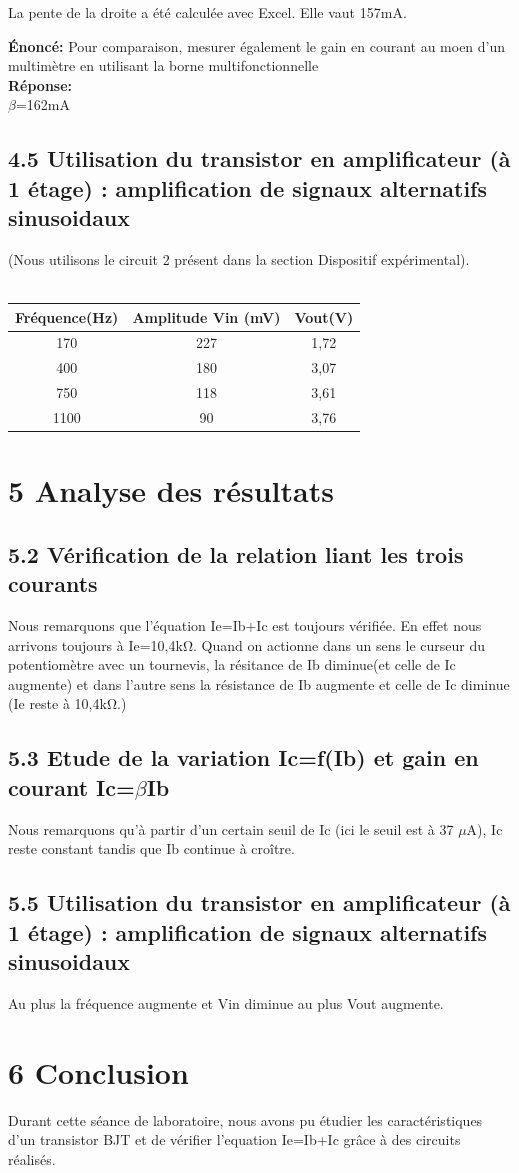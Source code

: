 \documentclass{report}
\begin{document}
La pente de la droite a été calculée avec Excel. Elle vaut 157mA.


\textbf{\'Enonc\'e:} Pour comparaison, mesurer également le gain en courant au moen d'un multimètre en utilisant la borne multifonctionnelle\\

\textbf{R\'eponse:} \\
$\beta$=162mA

\subsection*{4.5 Utilisation du transistor en amplificateur (à 1 étage) : amplification de signaux alternatifs sinusoidaux}
(Nous utilisons le circuit 2 présent dans la section Dispositif expérimental).
\\
\\
\begin{tabular}{|c|c|c|}
\hline
\textbf{Fréquence(Hz)} & \textbf{Amplitude Vin (mV)} & \textbf{Vout(V)} \\
\hline
170 & 227 & 1,72  \\
\hline
400 & 180 & 3,07 \\
\hline
750 & 118 & 3,61 \\
\hline
1100 & 90 & 3,76 \\
\hline
\end{tabular}


\section*{5 Analyse des résultats}
\subsection*{5.2 Vérification de la relation liant les trois courants}
Nous remarquons que l'équation Ie=Ib+Ic est toujours vérifiée. En effet nous arrivons toujours à Ie=10,4k$\si{\ohm}$.
Quand on actionne dans un sens le curseur du potentiomètre avec un tournevis, la résitance de Ib diminue(et celle de Ic augmente) et dans l'autre sens la résistance de Ib augmente et celle de Ic diminue (Ie reste à 10,4k$\si{\ohm}$.)
\subsection*{5.3 Etude de la variation Ic=f(Ib) et gain en courant Ic=$\beta$Ib}
Nous remarquons qu'à partir d'un certain seuil de Ic (ici le seuil est à 37 $\mu$A), Ic reste constant tandis que Ib continue à croître.
\subsection*{5.5 Utilisation du transistor en amplificateur (à 1 étage) : amplification de signaux alternatifs sinusoidaux}
Au plus la fréquence augmente et Vin diminue au plus Vout augmente.

\section*{6 Conclusion}

Durant cette s\'eance de laboratoire, nous avons pu étudier les caractéristiques d'un transistor BJT et de vérifier l'equation Ie=Ib+Ic grâce à des circuits réalisés.
\end{document}
